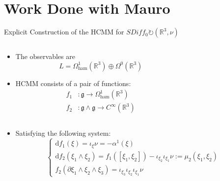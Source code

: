 \documentclass[handout,10pt]{beamer}
\begin{document}
\section{Work Done with Mauro}

  \begin{frame}{Explicit Construction of the HCMM for $SDiff_0 \circlearrowright (\mathbb{R}^3,\nu)$}\label{frame:explicithcmm}
	\begin{columns}
		\begin{column}[c]{.5\linewidth}
		  	\begin{itemize}
		  		\item The observables are  $$L= \Omega^1_{\textrm{ham}}(\mathbb{R}^3)\oplus\Omega^0(\mathbb{R}^3)$$
		  		\item HCMM consists of a pair of functions:
					\begin{align*}
						f_1 &\colon \mathfrak{g} \rightarrow \Omega^1_{\textrm{ham}}(\mathbb{R}^3) \\
						f_2 &\colon \mathfrak{g}\wedge\mathfrak{g} \rightarrow C^\infty(\mathbb{R}^3)
					\end{align*}	
		  	\end{itemize}
		\end{column}	
	  	\hfill  	
		\begin{column}[c]{.5\linewidth}
  		
 	 	\end{column}
 	 \end{columns}
 	\begin{columns}
		\begin{column}[c]{.8\linewidth}
		 	 \begin{itemize}
				\item Satisfying the following system:
					\begin{displaymath}
						\begin{cases}
							\textrm{d} f_1(\xi) = \iota_\xi \nu = -\alpha^1(\xi) \\
							\textrm{d} f_2(\xi_1 \wedge \xi_2) = f_1\left([\xi_1,\xi_2]\right) - \iota_{\xi_2}\iota_{\xi_1} \nu 
							 := \mu_2(\xi_1,\xi_2)\\
							f_2\left(\partial \xi_1 \wedge \xi_2 \wedge \xi_3 \right) = \iota_{\xi_3}\iota_{\xi_2}\iota_{\xi_1} \nu

\end{cases}
\end{displaymath}
\end{itemize}
\end{column}
\end{columns}
\end{frame}
\end{document}
